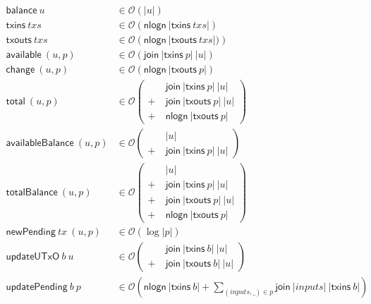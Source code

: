 \documentclass{article}
\newcommand{\order}[1]{\mathcal{O}\left(#1\right)}
\begin{document}
\begin{equation*}
\begin{split}
\mathsf{balance} ~ u & \in \order{|u|} \\
\mathsf{txins}   ~ txs  & \in \order{\mathsf{nlogn} ~ |\mathsf{txins}~ txs|} \\
\mathsf{txouts}  ~ txs  & \in \order{\mathsf{nlogn} ~ |\mathsf{txouts}~ txs|)} \\
\mathsf{available} ~ (u,p) & \in \order{\mathsf{join} ~ |\mathsf{txins}~ p| ~ |u|} \\
\mathsf{change}    ~ (u,p) & \in \order{\mathsf{nlogn} ~ |\mathsf{txouts}~ p| } \\
\mathsf{total}     ~ (u,p) & \in \order{
                              \begin{split}
                                & ~ \mathsf{join} ~ |\mathsf{txins}~ p| ~ |u| \\
                              + & ~ \mathsf{join} ~ |\mathsf{txouts}~ p| ~ |u| \\
                              + & ~ \mathsf{nlogn} ~ |\mathsf{txouts}~ p|
                              \end{split}} \\
\mathsf{availableBalance} ~ (u,p) & \in \order{
                              \begin{split}
                                & ~ |u| \\
                              + & ~ \mathsf{join} ~ |\mathsf{txins}~ p| ~ |u|
                              \end{split}} \\
\mathsf{totalBalance}     ~ (u,p) & \in \order{
                              \begin{split}
                                & ~ |u| \\
                              + & ~ \mathsf{join} ~ |\mathsf{txins}~ p| ~ |u| \\
                              + & ~ \mathsf{join} ~ |\mathsf{txouts}~ p| ~ |u| \\
                              + & ~ \mathsf{nlogn} ~ |\mathsf{txouts}~ p|
                              \end{split}} \\
\mathsf{newPending} ~ tx ~ (u,p) & \in \order{\log |p|} \\
\mathsf{updateUTxO} ~ b ~ u & \in \order{
                              \begin{split}
                                & ~ \mathsf{join} ~ |\mathsf{txins}~ b| ~ |u| \\
                              + & ~ \mathsf{join} ~ |\mathsf{txouts}~ b| ~ |u|
                              \end{split}} \\
\mathsf{updatePending} ~ b ~ p & \in \order{\mathsf{nlogn} ~ |\mathsf{txins}~ b| + \sum_{(inputs, \_) \in p}{\mathsf{join} ~ |inputs| ~ |\mathsf{txins}~ b|}}
\end{split}
\end{equation*}
\end{document}
